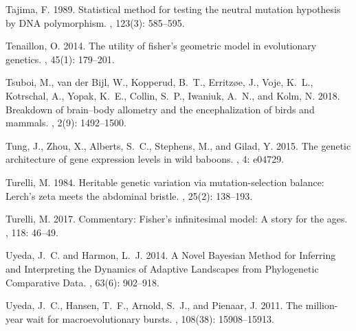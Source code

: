 \documentclass{article}
\providecommand{\DIFaddend}{} %
\DeclareRobustCommand{\DIFaddend}{\DIFOaddend \let\includegraphics\DIFOincludegraphics} %
\begin{document}
\begin{thebibliography}{}
    \DIFaddend {}
    Tajima, F. 1989.
    \newblock Statistical method for testing the neutral mutation hypothesis by
        {{DNA}} polymorphism.
    , {123}(3): 585--595.

    Tenaillon, O. 2014.
    \newblock The utility of fisher's geometric model in evolutionary genetics.
    ,
        {45}(1): 179--201.

    Tsuboi, M., {van der Bijl}, W., Kopperud, B.~T., Erritz{\o}e, J., Voje, K.~L.,
    Kotrschal, A., Yopak, K.~E., Collin, S.~P., Iwaniuk, A.~N., and Kolm, N.
    2018.
    \newblock Breakdown of brain--body allometry and the encephalization of birds
    and mammals.
    , {2}(9): 1492--1500.

    Tung, J., Zhou, X., Alberts, S.~C., Stephens, M., and Gilad, Y. 2015.
    \newblock The genetic architecture of gene expression levels in wild baboons.
    , {4}: e04729.

    Turelli, M. 1984.
    \newblock Heritable genetic variation via mutation-selection balance:
        {{Lerch}}'s zeta meets the abdominal bristle.
    , {25}(2): 138--193.

    Turelli, M. 2017.
    \newblock Commentary: {{Fisher}}'s infinitesimal model: {{A}} story for the
    ages.
    , {118}: 46--49.

    Uyeda, J.~C. and Harmon, L.~J. 2014.
    \newblock A {{Novel Bayesian Method}} for {{Inferring}} and {{Interpreting}}
    the {{Dynamics}} of {{Adaptive Landscapes}} from {{Phylogenetic Comparative
    Data}}.
    , {63}(6): 902--918.

    Uyeda, J.~C., Hansen, T.~F., Arnold, S.~J., and Pienaar, J. 2011.
    \newblock The million-year wait for macroevolutionary bursts.
    , {108}(38):
    15908--15913.


\end{thebibliography}
\end{document}
